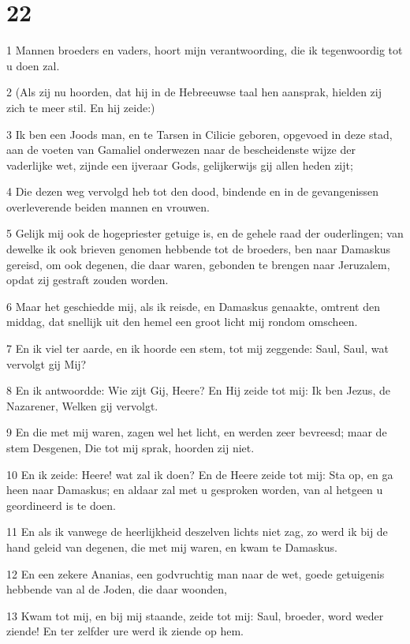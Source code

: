 \chapter{22}

\par 1 Mannen broeders en vaders, hoort mijn verantwoording, die ik tegenwoordig tot u doen zal.
\par 2 (Als zij nu hoorden, dat hij in de Hebreeuwse taal hen aansprak, hielden zij zich te meer stil. En hij zeide:)
\par 3 Ik ben een Joods man, en te Tarsen in Cilicie geboren, opgevoed in deze stad, aan de voeten van Gamaliel onderwezen naar de bescheidenste wijze der vaderlijke wet, zijnde een ijveraar Gods, gelijkerwijs gij allen heden zijt;
\par 4 Die dezen weg vervolgd heb tot den dood, bindende en in de gevangenissen overleverende beiden mannen en vrouwen.
\par 5 Gelijk mij ook de hogepriester getuige is, en de gehele raad der ouderlingen; van dewelke ik ook brieven genomen hebbende tot de broeders, ben naar Damaskus gereisd, om ook degenen, die daar waren, gebonden te brengen naar Jeruzalem, opdat zij gestraft zouden worden.
\par 6 Maar het geschiedde mij, als ik reisde, en Damaskus genaakte, omtrent den middag, dat snellijk uit den hemel een groot licht mij rondom omscheen.
\par 7 En ik viel ter aarde, en ik hoorde een stem, tot mij zeggende: Saul, Saul, wat vervolgt gij Mij?
\par 8 En ik antwoordde: Wie zijt Gij, Heere? En Hij zeide tot mij: Ik ben Jezus, de Nazarener, Welken gij vervolgt.
\par 9 En die met mij waren, zagen wel het licht, en werden zeer bevreesd; maar de stem Desgenen, Die tot mij sprak, hoorden zij niet.
\par 10 En ik zeide: Heere! wat zal ik doen? En de Heere zeide tot mij: Sta op, en ga heen naar Damaskus; en aldaar zal met u gesproken worden, van al hetgeen u geordineerd is te doen.
\par 11 En als ik vanwege de heerlijkheid deszelven lichts niet zag, zo werd ik bij de hand geleid van degenen, die met mij waren, en kwam te Damaskus.
\par 12 En een zekere Ananias, een godvruchtig man naar de wet, goede getuigenis hebbende van al de Joden, die daar woonden,
\par 13 Kwam tot mij, en bij mij staande, zeide tot mij: Saul, broeder, word weder ziende! En ter zelfder ure werd ik ziende op hem.

